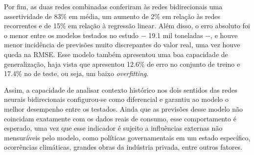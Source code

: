 Por fim, as duas redes combinadas conferiram às redes bidirecionais uma 
assertividade de 83\% em média, um aumento de 2\% em relação às redes recorrentes e de
15\% em relação à regressão linear. Além disso, o erro absoluto foi o menor entre 
os modelos testados no estudo $-$ 19.1 mil toneladas $-$, e houve menor 
incidência de previsões muito discrepantes do valor real, uma vez houve queda
na RMSE. Esse modelo também apresentou uma boa capacidade de generalização, 
haja vista que apresentou 12.6\% de erro no conjunto de treino e 17.4\% no de teste,
ou seja, um baixo \textit{overfitting}.

Assim, a capacidade de analisar contexto histórico nos dois sentidos das redes
neurais bidirecionais configurou-se como diferencial e garantiu ao modelo o 
melhor desempenho entre os testados. Ainda que as previsões desse modelo 
não coincidam exatamente com os dados reais de consumo, esse comportamento é 
esperado, uma vez que esse indicador é sujeito a 
influências externas não mensuráveis pelo modelo, como políticas governamentais
em um estado específico, ocorrências climáticas, grandes obras da indústria
privada, entre outros fatores.

